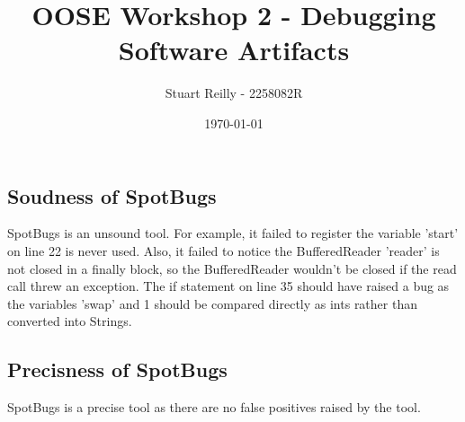 \documentclass[11pt]{article}
\begin{document}
    \author{Stuart Reilly - 2258082R}
    \date{\today}
    \title{OOSE Workshop 2 - Debugging Software Artifacts}
    \maketitle

    \subsection*{Soudness of SpotBugs}
    SpotBugs is an unsound tool.
    For example, it failed to register the variable 'start' on line 22 is never used.
    Also, it failed to notice the BufferedReader 'reader' is not closed in a finally block, so the BufferedReader wouldn't be closed if the read call threw an exception.
    The if statement on line 35 should have raised a bug as the variables 'swap' and 1 should be compared directly as ints rather than converted into Strings.

    \subsection*{Precisness of SpotBugs}
    SpotBugs is a precise tool as there are no false positives raised by the tool.
\end{document}
